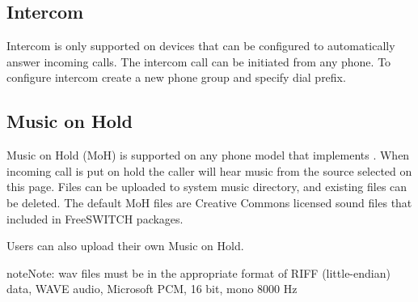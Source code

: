 \documentclass[letterpaper,10pt,english]{sphinxmanual}
\begin{document}
\subsection{Intercom}
\label{\detokenize{webui:intercom}}\label{\detokenize{webui:id14}}
Intercom is only supported on devices that can be configured to automatically answer incoming calls.
The intercom call can be initiated from any phone. To configure intercom create a new phone group and specify dial prefix.
\begin{quote}

\end{quote}


\subsection{Music on Hold}
\label{\detokenize{webui:music-on-hold}}\label{\detokenize{webui:id15}}
Music on Hold (MoH) is supported on any phone model that implements  .
When incoming call is put on hold the caller will hear music from the source selected on this page.
Files can be uploaded to system music directory, and existing files can be deleted.
The default MoH files are Creative Commons licensed sound files that included in FreeSWITCH packages.
\begin{quote}

\end{quote}

Users can also upload their own Music on Hold.
\begin{quote}

\end{quote}

\begin{sphinxadmonition}{note}{Note:}
wav files must be in the appropriate format of RIFF (little-endian) data, WAVE audio, Microsoft PCM, 16 bit, mono 8000 Hz
\end{sphinxadmonition}
\end{document}
